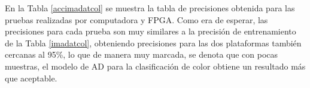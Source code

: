 \documentclass[twoside,spanish,ESP,MSc]{plantillaLabUPV}
\theoremstyle{definition}
\begin{document}
En la Tabla \ref{accimadatcol} se muestra la tabla de precisiones obtenida para las pruebas realizadas por computadora y FPGA. Como era de esperar, las precisiones para cada prueba son muy similares a la precisión de entrenamiento de la Tabla \ref{imadatcol}, obteniendo precisiones para las dos plataformas también cercanas al 95\%, lo que de manera muy marcada, se denota que con pocas muestras, el modelo de AD para la clasificación de color obtiene un resultado más que aceptable.


\begin{table}[!tbh]
	\caption{Precisión por computadora y FPGA de modelo AD de clasificación de color.}
	\label{accimadatcol}
	\centering

\end{table}
\end{document}

